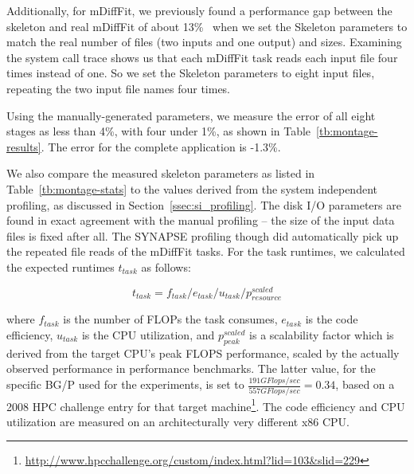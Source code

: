 \documentclass[preprint,12pt]{elsarticle}
\begin{document}
%
Additionally, for mDiffFit, we previously found a performance
gap between the skeleton and real mDiffFit of about 13\%~\cite{Skeleton2013} when we set the Skeleton parameters to match the
real number of files (two inputs and one output) and sizes. Examining the system call 
trace shows us that each mDiffFit task reads each input file four times instead of one. So we set 
the Skeleton parameters to eight input files, repeating the two input file names four times.

Using the manually-generated parameters, we measure the error of all eight stages as less than 4\%, with four under 1\%, as shown in Table~\ref{tb:montage-results}. The error for the complete application is -1.3\%.

We also compare the measured skeleton parameters as listed in
Table~\ref{tb:montage-stats} to the values derived from the system
independent profiling, as discussed in Section~\ref{ssec:si_profiling}. 
The disk I/O parameters are found in exact agreement with the manual
profiling -- the size of the input data files is fixed after all.
The SYNAPSE profiling though did automatically pick up the repeated file
reads of the mDiffFit tasks.  For the task runtimes, we calculated the
expected runtimes $t_{task}$ as follows:
 
$$
  t_{task} = f_{task} / e_{task} / u_{task} / p_{resource}^{scaled} 
$$

where $f_{task}$ is the number of FLOPs the task consumes, $e_{task}$
is the code efficiency, $u_{task}$ is the CPU utilization, and
$p_{peak}^{scaled}$ is a scalability factor which is derived from the
target CPU's peak FLOPS performance, scaled by the actually observed
performance in performance benchmarks.  The latter value, for the
specific BG/P used for the experiments, is set to 
$\frac{191 GFlops/sec}{557 GFlops/sec} = 0.34$,
based on a 2008 HPC challenge entry for that
target
machine\footnote{\url{http://www.hpcchallenge.org/custom/index.html?lid=103&slid=229}}.
The code efficiency and CPU utilization are measured on an
architecturally very different x86 CPU.
\end{document}
